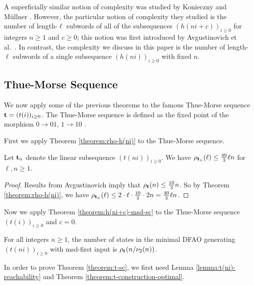 \documentclass[12pt,reqno]{article}
\begin{document}
\begin{remark}
  A superficially similar notion of complexity was studied by Konieczny and M\"ullner \cite{konieczny_arithmetical_2024}. However, the particular notion of complexity they studied is the number of length-$\ell$ subwords of all of the subsequences $(h(ni+c))_{i \geq 0}$ for integers $n\geq 1$ and $c \geq0$; this notion was first introduced by Avgustinovich et al.~\cite{avgustinovich_arithmetical_2003}.  In contrast, the complexity we discuss in this paper is the number of length-$\ell$ subwords of a single subsequence $(h(ni))_{i \geq0}$ with fixed $n$.
\end{remark}

\subsection{Thue-Morse Sequence}
We now apply some of the previous theorems to the famous Thue-Morse sequence ${\bf t} =(t(i))_{i \geq 0}$. The Thue-Morse sequence is
defined as the fixed point of the 
morphism $0 \rightarrow 01$,
$1 \rightarrow 10$ \cite{allouche_ubiquitous_1999}.


First we apply Theorem \ref{theorem:rho-h(ni)} to the Thue-Morse sequence.


\begin{corollary}
    Let ${\bf t}_n$ denote the linear subsequence $(t(ni))_{i \geq 0}$. We have $\rho_{{\bf t}_n}(\ell) \leq  \frac{40}{3}\ell n$ for $\ell, n \geq 1$.
\end{corollary}
\begin{proof}
    Results from Avgustinovich \cite{avgustinovich_number_1994} imply that $\rho_{\bf t}(n) \leq \frac{10}{3} n$. So by Theorem \ref{theorem:rho-h(ni)},
we have $\rho_{{\bf t} _n}(\ell) \leq 2 \cdot \ell \cdot \frac{10}{3} \cdot 2n = \frac{40}{3}\ell n$.
\end{proof}


Now we apply Theorem \ref{theorem:h(ni+c)-msd-sc} to the Thue-Morse sequence $(t(i))_{i \geq 0}$ and $c=0$. 

\begin{theorem} \label{theorem:t-sc}
    For all integers $n \geq 1$, the number of states in the minimal DFAO generating $(t(ni))_{i \geq 0}$ with msd-first input is $\rho_{\bf t}(n/\nu_2(n))$.
\end{theorem}

In order to prove Theorem \ref{theorem:t-sc}, we first need Lemma \ref{lemma:t(ni)-reachability} and Theorem \ref{theorem:t-construction-optimal}.
\end{document}
